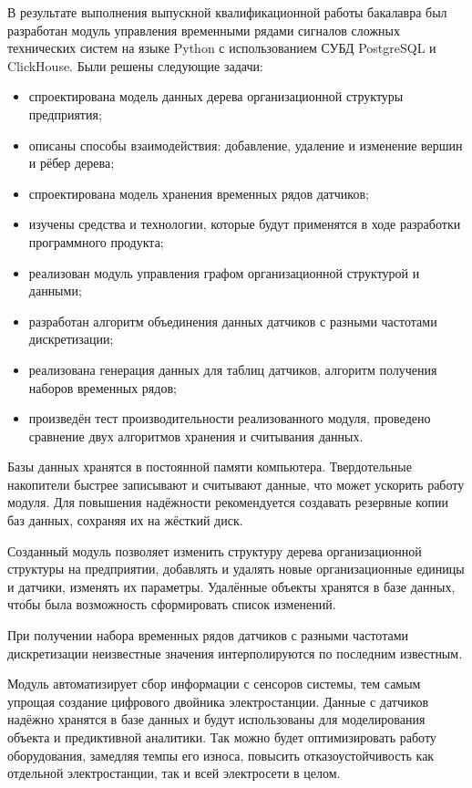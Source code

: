 \conclusion

В результате выполнения выпускной квалификационной работы бакалавра был разработан модуль управления временными рядами сигналов сложных технических систем на языке Python с использованием СУБД PostgreSQL и ClickHouse. Были решены следующие задачи:

\begin{itemize}
    \item спроектирована модель данных дерева организационной структуры предприятия;
    \item описаны способы взаимодействия: добавление, удаление и изменение вершин и рёбер дерева;
    \item спроектирована модель хранения временных рядов датчиков;
    \item изучены средства и технологии, которые будут применятся в ходе разработки программного продукта;
    \item реализован модуль управления графом организационной структурой и данными;
    \item разработан алгоритм объединения данных датчиков с разными частотами дискретизации;
    \item реализована генерация данных для таблиц датчиков, алгоритм получения наборов временных рядов;
    \item произведён тест производительности реализованного модуля, проведено сравнение двух алгоритмов хранения и считывания данных.
\end{itemize}

Базы данных хранятся в постоянной памяти компьютера. Твердотельные накопители быстрее записывают и считывают данные, что может ускорить работу модуля. Для повышения надёжности рекомендуется создавать резервные копии баз данных, сохраняя их на жёсткий диск.

Созданный модуль позволяет изменить структуру дерева организационной структуры на предприятии, добавлять и удалять новые организационные единицы и датчики, изменять их параметры. Удалённые объекты хранятся в базе данных, чтобы была возможность сформировать список изменений.

При получении набора временных рядов датчиков с разными частотами дискретизации неизвестные значения интерполируются по последним известным.

Модуль автоматизирует сбор информации с сенсоров системы, тем самым упрощая создание цифрового двойника электростанции. Данные с датчиков надёжно хранятся в базе данных и будут использованы для моделирования объекта и предиктивной аналитики. Так можно будет оптимизировать работу оборудования, замедляя темпы его износа, повысить отказоустойчивость как отдельной электростанции, так и всей электросети в целом.
